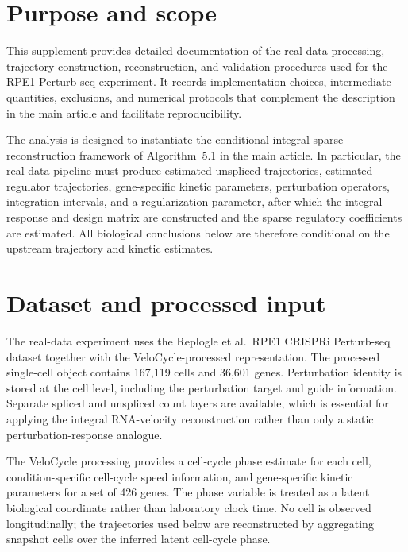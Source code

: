 \documentclass[supplement,onefignum,onetabnum]{siamart251216}
\begin{document}
\maketitle

\section{Purpose and scope}
\label{sec:supp-rpe1}

This supplement provides detailed documentation of the real-data processing, trajectory construction, reconstruction, and validation procedures used for the RPE1 Perturb-seq experiment. It records implementation choices, intermediate quantities, exclusions, and numerical protocols that complement the description in the main article and facilitate reproducibility.

The analysis is designed to instantiate the conditional integral sparse reconstruction framework of Algorithm~5.1 in the main article. In particular, the real-data pipeline must produce estimated unspliced trajectories, estimated regulator trajectories, gene-specific kinetic parameters, perturbation operators, integration intervals, and a regularization parameter, after which the integral response and design matrix are constructed and the sparse regulatory coefficients are estimated. All biological conclusions below are therefore conditional on the upstream trajectory and kinetic estimates.

\section{Dataset and processed input}

The real-data experiment uses the Replogle et al.\ RPE1 CRISPRi Perturb-seq dataset together with the VeloCycle-processed representation. The processed single-cell object contains 167,119 cells and 36,601 genes. Perturbation identity is stored at the cell level, including the perturbation target and guide information. Separate spliced and unspliced count layers are available, which is essential for applying the integral RNA-velocity reconstruction rather than only a static perturbation-response analogue.

The VeloCycle processing provides a cell-cycle phase estimate for each cell, condition-specific cell-cycle speed information, and gene-specific kinetic parameters for a set of 426 genes. The phase variable is treated as a latent biological coordinate rather than laboratory clock time. No cell is observed longitudinally; the trajectories used below are reconstructed by aggregating snapshot cells over the inferred latent cell-cycle phase.
\end{document}
